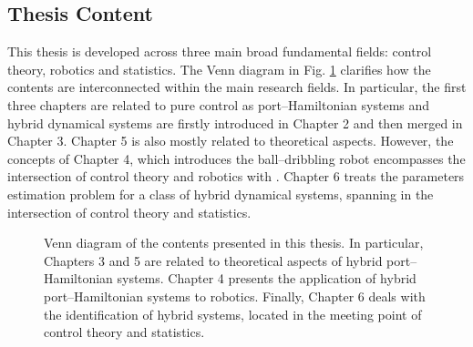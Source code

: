 \subsection{Thesis Content}
This thesis is developed across three main broad fundamental fields: control theory, robotics and statistics. The Venn diagram in Fig. \ref{fig:venn} clarifies how the contents are interconnected within the main research fields. In particular, the first three chapters are related to pure control as port--Hamiltonian systems and hybrid dynamical systems are firstly introduced in Chapter 2 and then merged in Chapter 3. Chapter 5 is also mostly related to theoretical aspects. However, the concepts of Chapter 4, which introduces the ball--dribbling robot encompasses the intersection of control theory and robotics with . Chapter 6 treats the parameters estimation problem for a class of hybrid dynamical systems, spanning in the intersection of control theory and statistics.

\begin{figure}
    \centering
    
    \vspace{5mm}
    \caption[Venn diagram of the contents presented in this thesis.]{Venn diagram of the contents presented in this thesis. In particular, Chapters 3 and 5 are related to theoretical aspects of hybrid port--Hamiltonian systems. Chapter 4 presents the application of hybrid port--Hamiltonian systems to robotics. Finally, Chapter 6 deals with the identification of hybrid systems, located in the meeting point of control theory and statistics.}
    \label{fig:venn}
\end{figure}

\clearpage
